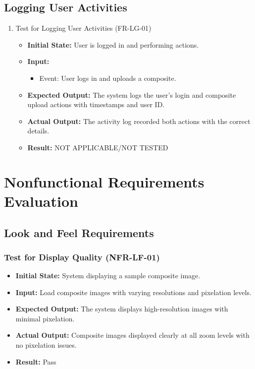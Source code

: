 \documentclass[12pt, titlepage]{article}
\begin{document}
\subsection{Logging User Activities}
\begin{enumerate}
    
    \item Test for Logging User Activities (FR-LG-01)
    \begin{itemize}
        \item \textbf{Initial State:} User is logged in and performing actions.
        \item \textbf{Input:}
        \begin{itemize}
            \item Event: User logs in and uploads a composite.
        \end{itemize}
        \item \textbf{Expected Output:} The system logs the user's login and composite upload actions with timestamps and user ID.
        \item \textbf{Actual Output:} The activity log recorded both actions with the correct details.
        \item \textbf{Result:} NOT APPLICABLE/NOT TESTED
    \end{itemize}
\end{enumerate}

\section{Nonfunctional Requirements Evaluation}

\subsection{Look and Feel Requirements}

\subsubsection{Test for Display Quality (NFR-LF-01)}
\begin{itemize}
    \item \textbf{Initial State: }System displaying a sample composite image.
    \item \textbf{Input: }Load composite images with varying resolutions and pixelation levels.
    \item \textbf{Expected Output: }The system displays high-resolution images with minimal pixelation.
    \item \textbf{Actual Output: }Composite images displayed clearly at all zoom levels with no pixelation issues.
    \item \textbf{Result: }Pass
\end{itemize}
\end{document}
